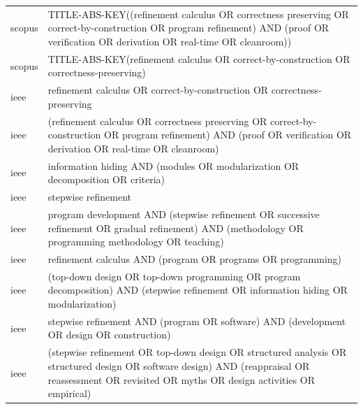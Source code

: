 \documentclass{article}
\begin{document}
\begin{longtable}{lp{10cm}}
scopus & TITLE-ABS-KEY((\textquotedbl{}refinement calculus\textquotedbl{} OR \textquotedbl{}correctness preserving\textquotedbl{} OR \textquotedbl{}correct-by-construction\textquotedbl{} OR \textquotedbl{}program refinement\textquotedbl{}) AND (proof OR verification OR derivation OR \textquotedbl{}real-time\textquotedbl{} OR cleanroom)) \\
scopus & TITLE-ABS-KEY(\textquotedbl{}refinement calculus\textquotedbl{} OR \textquotedbl{}correct-by-construction\textquotedbl{} OR \textquotedbl{}correctness-preserving\textquotedbl{}) \\
ieee & \textquotedbl{}refinement calculus\textquotedbl{} OR \textquotedbl{}correct-by-construction\textquotedbl{} OR \textquotedbl{}correctness-preserving\textquotedbl{} \\
ieee & (\textquotedbl{}refinement calculus\textquotedbl{} OR \textquotedbl{}correctness preserving\textquotedbl{} OR \textquotedbl{}correct-by-construction\textquotedbl{} OR \textquotedbl{}program refinement\textquotedbl{}) AND (proof OR verification OR derivation OR \textquotedbl{}real-time\textquotedbl{} OR cleanroom) \\
ieee & \textquotedbl{}information hiding\textquotedbl{} AND (modules OR modularization OR decomposition OR criteria) \\
ieee & \textquotedbl{}stepwise refinement\textquotedbl{} \\
ieee & \textquotedbl{}program development\textquotedbl{} AND (\textquotedbl{}stepwise refinement\textquotedbl{} OR \textquotedbl{}successive refinement\textquotedbl{} OR \textquotedbl{}gradual refinement\textquotedbl{}) AND (methodology OR \textquotedbl{}programming methodology\textquotedbl{} OR teaching) \\
ieee & \textquotedbl{}refinement calculus\textquotedbl{} AND (program OR programs OR programming) \\
ieee & (\textquotedbl{}top-down design\textquotedbl{} OR \textquotedbl{}top-down programming\textquotedbl{} OR \textquotedbl{}program decomposition\textquotedbl{}) AND (\textquotedbl{}stepwise refinement\textquotedbl{} OR \textquotedbl{}information hiding\textquotedbl{} OR modularization) \\
ieee & \textquotedbl{}stepwise refinement\textquotedbl{} AND (program OR software) AND (development OR design OR construction) \\
ieee & (\textquotedbl{}stepwise refinement\textquotedbl{} OR \textquotedbl{}top-down design\textquotedbl{} OR \textquotedbl{}structured analysis\textquotedbl{} OR \textquotedbl{}structured design\textquotedbl{} OR \textquotedbl{}software design\textquotedbl{}) AND (reappraisal OR reassessment OR revisited OR myths OR \textquotedbl{}design activities\textquotedbl{} OR empirical) \\

\end{longtable}
\end{document}
